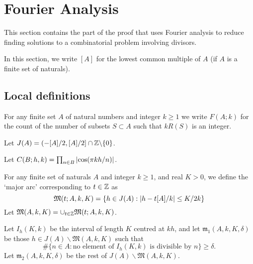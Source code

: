 \chapter{Fourier Analysis}
\label{chap:fourier}

This section contains the part of the proof that uses Fourier analysis to reduce finding solutions to a combinatorial problem involving divisors.

In this section, we write $[A]$ for the lowest common multiple of $A$ (if $A$ is a finite set of naturals).
\section{Local definitions}

\begin{definition}
  \label{def:integer_count}
  \leanok
For any finite set $A$ of natural numbers and integer $k\geq 1$ we write $F(A;k)$ for the count of the number of subsets $S\subset A$ such that $kR(S)$ is an integer.
\end{definition}

\begin{definition}
  \label{def:j}
  \leanok
  Let $J(A) = (-[A]/2,[A]/2]\cap\mathbb{Z} \backslash \{0\}$.
\end{definition}

\begin{definition}
  \label{def:cos_prod}
  \leanok
  Let $C(B;h,k) = \prod_{n\in B}\left\lvert \cos(\pi kh/n)\right\rvert$.
\end{definition}

\begin{definition}
  \label{def:major_arc}
  \leanok
  For any finite set of naturals $A$ and integer $k\geq 1$, and real $K>0$, we define the `major arc' corresponding to $t\in\mathbb{Z}$ as
\[\mathfrak{M}(t;A,k,K) = \{ h\in  J(A): \left\lvert h-t[A]/k\right\rvert\leq K/2k\}\]
  Let $\mathfrak{M}(A,k,K) = \cup_{t\in \mathbb{Z}}\mathfrak{M}(t;A,k,K)$.
\end{definition}

\begin{definition}
  \label{def:minor_arcs}
Let $I_h(K,k)$ be the interval of length $K$ centred at $kh$, and let $\mathfrak{m}_1(A,k,K,\delta)$ be those $h\in J(A)\backslash \mathfrak{M}(A,k,K)$ such that
\[\# \{ n\in A : \textrm{no element of }I_h(K,k)\textrm{ is divisible by }n\}\geq \delta.\]
Let $\mathfrak{m}_2(A,k,K,\delta)$ be the rest of $J(A)\backslash\mathfrak{M}(A,k,K)$.
\end{definition}

